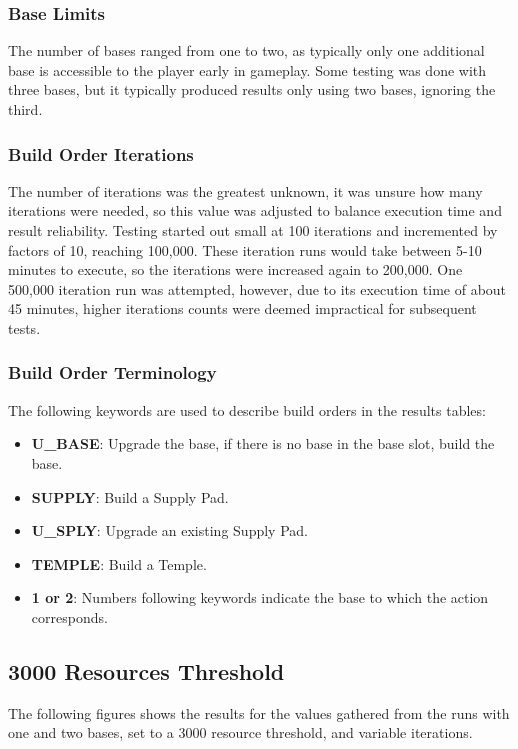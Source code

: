 \documentclass[a4paper, 12pt, english]{article}
\begin{document}
\subsubsection{Base Limits}
The number of bases ranged from one to two, as typically only one additional base is accessible to the player early in gameplay. Some testing was done with three bases, but it typically produced results only using two bases, ignoring the third.
\newline

\subsubsection{Build Order Iterations}
The number of iterations was the greatest unknown, it was unsure how many iterations were needed, so this value was adjusted to balance execution time and result reliability. Testing started out small at 100 iterations and incremented by factors of 10, reaching 100,000. These iteration runs would take between 5-10 minutes to execute, so the iterations were increased again to 200,000. One 500,000 iteration run was attempted, however, due to its execution time of about 45 minutes, higher iterations counts were deemed impractical for subsequent tests.
\newline


\subsubsection{Build Order Terminology}
The following keywords are used to describe build orders in the results tables:
    \begin{itemize}
    \item \textbf{U\_BASE}: Upgrade the base, if there is no base in the base slot, build the base.
    \item \textbf{SUPPLY}: Build a Supply Pad.
    \item \textbf{U\_SPLY}: Upgrade an existing Supply Pad.
    \item \textbf{TEMPLE}: Build a Temple.
    \item \textbf{1 or 2}: Numbers following keywords indicate the base to which the action corresponds.
    \end{itemize}
    

\newpage
\subsection{3000 Resources Threshold}
The following figures shows the results for the values gathered from the runs with one and two bases, set to a 3000 resource threshold, and variable iterations. 
\end{document}
